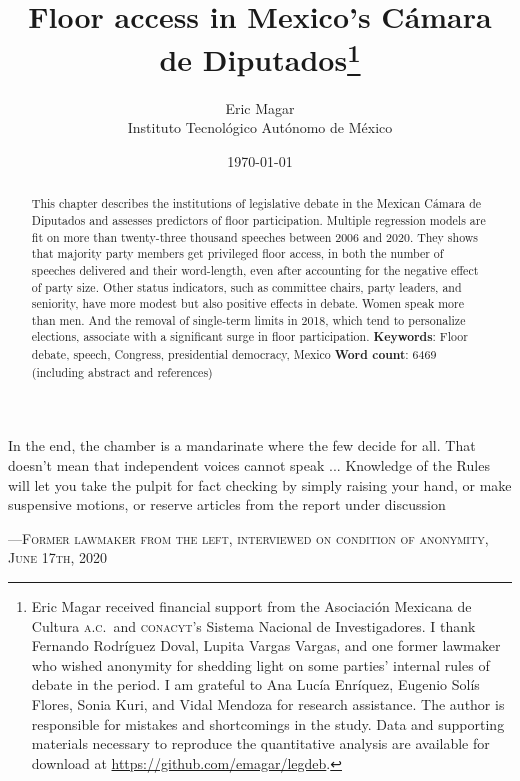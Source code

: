 \documentclass[letter,12pt]{article}
\begin{document}
\title{Floor access in Mexico's Cámara de Diputados\thanks{Eric Magar received financial support from the Asociaci\'on Mexicana de Cultura \textsc{a.c.}\ and \textsc{conacyt}'s Sistema Nacional de Investigadores. I thank Fernando Rodríguez Doval, Lupita Vargas Vargas, and one former lawmaker who wished anonymity for shedding light on some parties' internal rules of debate in the period. I am grateful to Ana Lucía Enríquez, Eugenio Solís Flores, Sonia Kuri, and Vidal Mendoza for research assistance. The author is responsible for mistakes and shortcomings in the study. Data and supporting materials necessary to reproduce the quantitative analysis are available for download at \url{https://github.com/emagar/legdeb}.}}
\author{Eric Magar \\ Instituto Tecnológico Autónomo de México}
\date{\today}
\maketitle


\begin{abstract}
\noindent This chapter describes the institutions of legislative debate in the Mexican Cámara de Diputados and assesses predictors of floor participation. Multiple regression models are fit on more than twenty-three thousand speeches between 2006 and 2020. They shows that majority party members get privileged floor access, in both the number of speeches delivered and their word-length, even after accounting for the negative effect of party size. Other status indicators, such as committee chairs, party leaders, and seniority, have more modest but also positive effects in debate. Women speak more than men. And the removal of single-term limits in 2018, which tend to personalize elections, associate with a significant surge in floor participation. 
\newline
\newline
\textbf{Keywords}: Floor debate, speech, Congress, presidential democracy, Mexico
\newline
\newline
\textbf{Word count}: 6469 (including abstract and references)
\end{abstract}

\newpage

\singlespacing
\epigraph{In the end, the chamber is a mandarinate where the few decide for all. That doesn't mean that independent voices cannot speak ... Knowledge of the Rules will let you take the pulpit for fact checking by simply raising your hand, or make suspensive motions, or reserve articles from the report under discussion}%
{---\textsc{Former lawmaker from the left, interviewed on condition of anonymity, June 17th, 2020}}
\doublespacing
\end{document}
